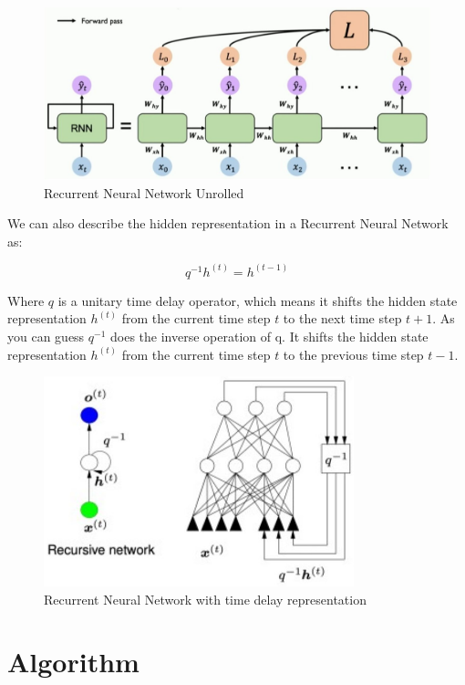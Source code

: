 \begin{figure}[h]
    \centering
    \includegraphics[width=15cm]{Images/rnn.jpg}
    \caption{Recurrent Neural Network Unrolled}
    \label{fig:rnn}
\end{figure}

\newpage
\noindent We can also describe the hidden representation in a Recurrent Neural Network as:

$$ q^{-1} h^{(t)} = h^{(t-1)} $$

Where $q$ is a unitary time delay operator, which means it shifts the hidden state representation $h^{(t)}$ from the current time step $t$ to the next time step $t + 1$. As you can guess $q^{-1}$ does the inverse operation of q. It shifts the hidden state representation $h^{(t)}$ from the current time step $t$ to the previous time step $t - 1$.

\begin{figure}[h]
    \centering
    \includegraphics[width=9cm]{Images/rnn-time-delay.jpg}
    \caption{Recurrent Neural Network with time delay representation}
    \label{fig:rnn-time-delay}
\end{figure}

\section{Algorithm}

